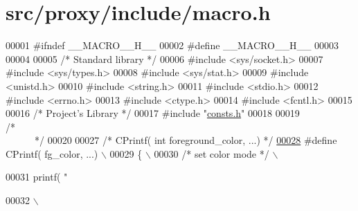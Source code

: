 \hypertarget{macro_8h_source}{
\section{src/proxy/include/macro.h}
}

\begin{DoxyCode}
00001 \textcolor{preprocessor}{#ifndef \_\_MACRO\_\_H\_\_}
00002 \textcolor{preprocessor}{}\textcolor{preprocessor}{#define \_\_MACRO\_\_H\_\_}
00003 \textcolor{preprocessor}{}
00004 
00005 \textcolor{comment}{/*      Standard library        */}
00006 \textcolor{preprocessor}{#include        <sys/socket.h>}
00007 \textcolor{preprocessor}{#include        <sys/types.h>}
00008 \textcolor{preprocessor}{#include        <sys/stat.h>}
00009 \textcolor{preprocessor}{#include        <unistd.h>}
00010 \textcolor{preprocessor}{#include        <string.h>}
00011 \textcolor{preprocessor}{#include        <stdio.h>}
00012 \textcolor{preprocessor}{#include        <errno.h>}
00013 \textcolor{preprocessor}{#include        <ctype.h>}
00014 \textcolor{preprocessor}{#include        <fcntl.h>}
00015 
00016 \textcolor{comment}{/*      Project's Library       */}
00017 \textcolor{preprocessor}{#include        "\hyperlink{proxy_2include_2consts_8h}{consts.h}"}
00018 
00019 \textcolor{comment}{/*~~~~~~~~~~~~~~~~~~~~~~~~~~~~~~~~~~~~~~~~~~~~~~~~~~~~~~~~~~~~~~~~~~~~~~~~~~~~*/}
00020 
00027 \textcolor{comment}{/*      CPrintf( int foreground\_color, ...)     */}
\hypertarget{macro_8h_source_l00028}{}\hyperlink{macro_8h_af3a90ce610048c9469b825ba9f3ddc4d}{00028} \textcolor{preprocessor}{#define CPrintf( fg\_color, ...)                                                                                                 \(\backslash\)
      }
00029 \textcolor{preprocessor}{\{                                                                                                                                                               \(\backslash\)
      }
00030 \textcolor{preprocessor}{        }\textcolor{comment}{/*      set color mode  */}                                                                                                              \(\backslash\)
      
00031         printf( "%
      
00032                                                                                                                                                                 \(\backslash\)
      

\end{DoxyCode}
